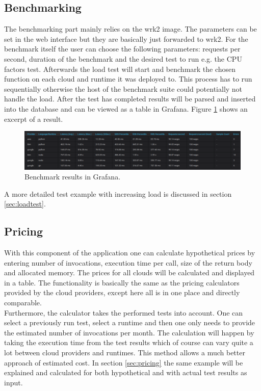\subsection{Benchmarking}
The benchmarking part mainly relies on the wrk2 image. The parameters can be set in the web interface but they are basically just forwarded to wrk2. For the benchmark itself the user can choose the following parameters: requests per second, duration of the benchmark and the desired test to run e.g. the \gls{CPU} factors test. Afterwards the load test will start and benchmark the chosen function on each cloud and runtime it was deployed to. This process has to run sequentially otherwise the host of the benchmark suite could potentially not handle the load. After the test has completed results will be parsed and inserted into the database and can be viewed as a table in Grafana. Figure \ref{fig:benchmark_table} shows an excerpt of a result.

\begin{figure}[htp]
\begin{center}
\includegraphics[width=1\textwidth]{bilder/benchmark_table.png}
\captionsetup{justification=centering, labelfont=bf}
\caption[Benchmark results in Grafana]{Benchmark results in Grafana.}
\label{fig:benchmark_table}
\end{center}
\end{figure}

A more detailed test example with increasing load is discussed in section \ref{sec:loadtest}.

\subsection{Pricing}
With this component of the application one can calculate hypothetical prices by entering number of invocations, execution time per call, size of the return body and allocated memory. The prices for all clouds will be calculated and displayed in a table. The functionality is basically the same as the pricing calculators provided by the cloud providers, except here all is in one place and directly comparable.\\
Furthermore, the calculator takes the performed tests into account. One can select a previously run test, select a runtime and then one only needs to provide the estimated number of invocations per month. The calculation will happen by taking the execution time from the test results which of course can vary quite a lot between cloud providers and runtimes. This method allows a much better approach of estimated cost. In section \ref{sec:pricing} the same example will be explained and calculated for both hypothetical and with actual test results as input.


